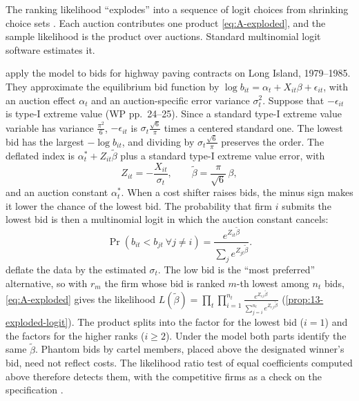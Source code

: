 The ranking likelihood ``explodes'' into a sequence of logit choices from shrinking choice sets
\citep{BeggsCardellHausman1981}. Each auction contributes one product \eqref{eq:A-exploded}, and the sample likelihood is
the product over auctions. Standard multinomial logit software estimates it.

\citet{PorterZona1993} apply the model to bids for highway paving contracts on Long Island, 1979--1985. They approximate the equilibrium bid
function by $\log b_{it} = \alpha_t + X_{it}\beta + \epsilon_{it}$, with an auction effect $\alpha_t$ and an auction-specific
error variance $\sigma_t^2$. Suppose that $-\epsilon_{it}$ is type-I extreme value (WP pp.~24--25). Since a standard
type-I extreme value variable has variance $\frac{\pi^2}{6}$, $-\epsilon_{it}$ is $\sigma_t\frac{\sqrt6}{\pi}$ times a
centered standard one. The lowest bid has the largest $-\log b_{it}$, and dividing by $\sigma_t\frac{\sqrt6}{\pi}$
preserves the order. The deflated index is $\alpha^*_t + Z_{it}\tilde\beta$ plus a standard type-I extreme value error, with
\begin{equation*}
  Z_{it} = -\frac{X_{it}}{\sigma_t}, \qquad \tilde\beta = \frac{\pi}{\sqrt6}\,\beta ,
\end{equation*}
and an auction constant $\alpha^*_t$. When a cost shifter raises bids, the minus sign makes it lower the chance of the lowest bid. The
probability that firm $i$ submits the lowest bid is then a multinomial logit in which the auction constant cancels:
\begin{equation*}
  \Pr(b_{it} < b_{jt}\ \forall j \ne i) = \frac{e^{Z_{it}\tilde\beta}}{\sum_je^{Z_{jt}\tilde\beta}}.
\end{equation*}
\citet{PorterZona1993} deflate the data by the estimated $\sigma_t$. The low bid is the ``most preferred'' alternative, so
with $r_m$ the firm whose bid is ranked $m$-th lowest among $n_t$ bids, \eqref{eq:A-exploded} gives the likelihood
$L(\tilde\beta) = \prod_t\prod_{i=1}^{n_t}\frac{e^{Z_{r_it}\tilde\beta}}{\sum_{j=i}^{n_t}e^{Z_{r_jt}\tilde\beta}}$
(\cref{prop:13-exploded-logit}). The product splits into the factor for the lowest bid ($i = 1$) and the factors for the higher
ranks ($i \ge 2$). Under the model both parts identify the same $\tilde\beta$. Phantom bids by cartel members, placed above the designated winner's bid, need not reflect costs.
The likelihood ratio test of equal coefficients computed above therefore detects them, with the competitive firms as a
check on the specification \citep{HausmanRuud1987}.

